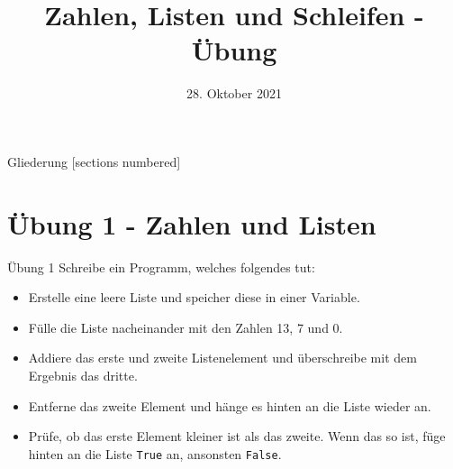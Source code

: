 



\title{Zahlen, Listen und Schleifen - Übung}
\date{28. Oktober 2021}


\maketitle

\begin{frame}{Gliederung}
	[sections numbered]
	\tableofcontents
\end{frame}


\section{Übung 1 - Zahlen und Listen}
\begin{frame}{Übung 1}
	Schreibe ein Programm, welches folgendes tut:
	\linebreak
	
	\begin{itemize}
		\item[\textbf{1.}] Erstelle eine leere Liste und speicher diese in einer Variable.
		\item[\textbf{2.}] Fülle die Liste nacheinander mit den Zahlen 13, 7 und 0.
		\item[\textbf{3.}] Addiere das erste und zweite Listenelement und überschreibe  mit dem Ergebnis das dritte.
		\item[\textbf{4.}] Entferne das zweite Element und hänge es hinten an die Liste wieder an.
		\item[\textbf{Zusatz}] Prüfe, ob das erste Element kleiner ist als das zweite. Wenn das so ist, füge hinten an die Liste \alert{\texttt{True}} an, ansonsten \alert{\texttt{False}}.
	\end{itemize}
	
\end{frame}


